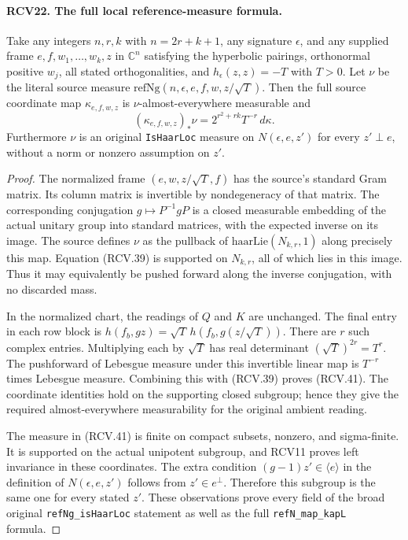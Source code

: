 \paragraph{RCV22. The full local reference-measure formula.}
\label{claim:RCV22}
Take any integers \(n,r,k\) with \(n=2r+k+1\), any signature
\(\epsilon\), and any supplied frame \(e,f,w_1,\ldots,w_k,z\)
in \(\mathbb C^n\) satisfying the hyperbolic pairings,
orthonormal positive \(w_j\), all stated orthogonalities, and
\(h_\epsilon(z,z)=-T\) with \(T>0\).
Let \(\nu\) be the literal source measure
\(\mathrm{refNg}(n,\epsilon,e,f,w,z/\sqrt T)\).
Then the full source coordinate map \(\kappa_{e,f,w,z}\) is
\(\nu\)-almost-everywhere measurable and
\[
       (\kappa_{e,f,w,z})_*\nu
                =2^{r^2+rk}T^{-r}\,d\kappa.
\tag{RCV.41}
\]
Furthermore \(\nu\) is an original \texttt{IsHaarLoc} measure
on \(N(\epsilon,e,z')\) for every \(z'\perp e\), without
a norm or nonzero assumption on \(z'\).
\begin{proof}
The normalized frame \((e,w,z/\sqrt T,f)\) has the source's
standard Gram matrix.  Its column matrix is invertible by
nondegeneracy of that matrix.  The corresponding conjugation
\(g\mapsto P^{-1}gP\) is a closed measurable embedding of the
actual unitary group into standard matrices, with the expected
inverse on its image.  The source defines \(\nu\) as the
pullback of \(\mathrm{haarLie}(N_{k,r},1)\) along precisely
this map.  Equation (RCV.39) is supported on \(N_{k,r}\), all
of which lies in this image.  Thus it may equivalently be pushed
forward along the inverse conjugation, with no discarded mass.

In the normalized chart, the readings of \(Q\) and \(K\)
are unchanged.  The final entry in each row block is
\(h(f_b,gz)=\sqrt T\,h(f_b,g(z/\sqrt T))\).
There are \(r\) such complex entries.  Multiplying each by
\(\sqrt T\) has real determinant \((\sqrt T)^{2r}=T^r\).
The pushforward of Lebesgue measure under this invertible linear
map is \(T^{-r}\) times Lebesgue measure.  Combining this
with (RCV.39) proves (RCV.41).  The coordinate identities hold
on the supporting closed subgroup; hence they give the required
almost-everywhere measurability for the original ambient reading.

The measure in (RCV.41) is finite on compact subsets, nonzero,
and sigma-finite.  It is supported on the actual unipotent subgroup,
and RCV11 proves left invariance in these coordinates.  The extra
condition \((g-1)z'\in\langle e\rangle\) in the definition of
\(N(\epsilon,e,z')\) follows from \(z'\in e^\perp\).
Therefore this subgroup is the same one for every stated \(z'\).
These observations prove every field of the broad original
\texttt{refNg\_isHaarLoc} statement as well as the full
\texttt{refN\_map\_kapL} formula.
\end{proof}

